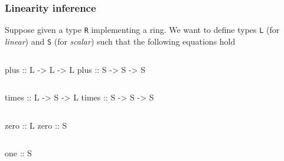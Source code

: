 \documentclass[10pt]{beamer}
\begin{document}
\begin{frame}[fragile]
  \frametitle{Linearity inference}

  \begin{center}
    Suppose given a type \lstinline{R} implementing a ring. We want to
    define types \alert{\lstinline{L}} (for \emph{linear}) and
    \alert{\lstinline{S}} (for \emph{scalar}) such that the following
      equations hold
  \end{center}
  
  \begin{columns}
    \begin{column}{0.5\textwidth}
  \begin{semiverbatim}
    plus :: L -> L -> L
    plus :: S -> S -> S
  \end{semiverbatim}
    \end{column}
    \begin{column}{0.5\textwidth}
    \end{column}
  \end{columns}
  
  \begin{columns}[c]
    \begin{column}{0.5\textwidth}
  \begin{semiverbatim}
    times :: L -> S -> L
    times :: S -> S -> S
  \end{semiverbatim}
    \end{column}
    \begin{column}{0.5\textwidth}
    \end{column}
  \end{columns}

  \begin{columns}
    \begin{column}{0.5\textwidth}
  \begin{semiverbatim}
    zero :: L
    zero :: S
  \end{semiverbatim}
    \end{column}
    \begin{column}{0.5\textwidth}
    \end{column}
  \end{columns}

  \begin{columns}
    \begin{column}{0.5\textwidth}
  \begin{semiverbatim}
    one :: S
  \end{semiverbatim}
    \end{column}
    \begin{column}{0.5\textwidth}
    \end{column}
  \end{columns}
\end{frame}  
\end{document}

